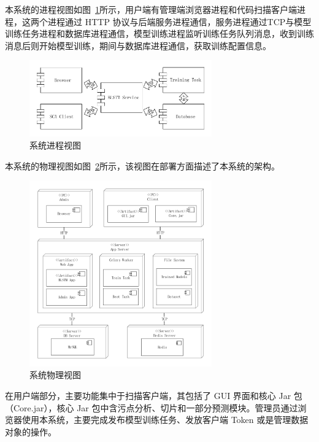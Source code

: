 本系统的进程视图如图~\ref{view:process}所示，用户端有管理端浏览器进程和代码扫描客户端进程，这两个进程通过 HTTP 协议与后端服务进程通信，服务进程通过TCP与模型训练任务进程和数据库进程通信，模型训练进程监听训练任务队列消息，收到训练消息后则开始模型训练，期间与数据库进程通信，获取训练配置信息。

\begin{figure}[!htb]
	\centering
	\includegraphics[width=0.7\textwidth]{FIGs/chapter3/viewprocess.pdf}
	\caption{系统进程视图}\label{view:process}
\end{figure}

本系统的物理视图如图~\ref{view:physical}所示，该视图在部署方面描述了本系统的架构。

\begin{figure}[!htb]
    \centering
    \includegraphics[width=0.7\textwidth]{FIGs/chapter3/viewphysical.pdf}
    \caption{系统物理视图}\label{view:physical}
\end{figure}

在用户端部分，主要功能集中于扫描客户端，其包括了 GUI 界面和核心 Jar 包（Core.jar），核心 Jar 包中含污点分析、切片和一部分预测模块。管理员通过浏览器使用本系统，主要完成发布模型训练任务、发放客户端 Token 或是管理数据对象的操作。

